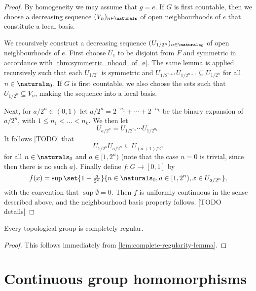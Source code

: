 \documentclass[article, a4paper, 11pt, oneside]{memoir}
\numberwithin{equation}{chapter}
\begin{document}
\begin{proof}
    By homogeneity we may assume that $g = e$. If $G$ is first countable, then we choose a decreasing sequence $(V_n)_{n \in \naturals}$ of open neighbourhoods of $e$ that constitute a local basis.

    We recursively construct a decreasing sequence $(U_{1/2^n})_{n \in \naturals_0}$ of open neighbourhoods of $e$. First choose $U_1$ to be disjoint from $F$ and symmetric in accordance with \cref{thm:symmetric_nhood_of_e}. The same lemma is applied recursively such that each $U_{1/2^n}$ is symmetric and $U_{1/2^{n+1}} U_{1/2^{n+1}} \subseteq U_{1/2^n}$ for all $n \in \naturals_0$. If $G$ is first countable, we also choose the sets such that $U_{1/2^n} \subseteq V_n$, making the sequence into a local basis.

    Next, for $a/2^n \in (0,1)$ let $a/2^n = 2^{-n_1} + \cdots + 2^{-n_k}$ be the binary expansion of $a/2^n$, with $1 \leq n_1 < \ldots < n_k$. We then let
    \begin{equation*}
        U_{a/2^n}
            = U_{1/2^{n_k}} \cdots U_{1/2^{n_1}}.
    \end{equation*}
    It follows [TODO] that
    \begin{equation*}
        U_{1/2^n} U_{a/2^n}
            \subseteq U_{(a+1)/2^n}
    \end{equation*}
    for all $n \in \naturals_0$ and $a \in [1,2^n)$ (note that the case $n = 0$ is trivial, since then there is no such $a$). Finally define $f \colon G \to [0,1]$ by
    \begin{equation*}
        f(x)
            = \sup \set{1 - \tfrac{a}{2^n}}{n \in \naturals_0, a \in [1,2^n), x \in U_{a/2^n}},
    \end{equation*}
    with the convention that $\sup \emptyset = 0$. Then $f$ is uniformly continuous in the sense described above, and the neighbourhood basis property follows. [TODO details]
\end{proof}


\begin{proposition}
    Every topological group is completely regular.
\end{proposition}

\begin{proof}
    This follows immediately from \cref{lem:complete-regularity-lemma}.
\end{proof}



\section{Continuous group homomorphisms}
\end{document}

